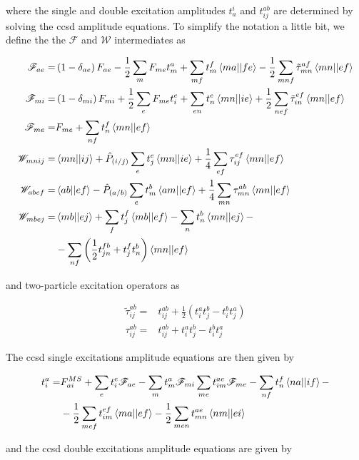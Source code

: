 where the single and double excitation amplitudes \(t_a^i\) and \(t_{ij}^{ab}\) are determined by solving the \acrshort{ccsd} amplitude equations. To simplify the notation a little bit, we define the the \(\mathscr{F}\) and \(\mathscr{W}\) intermediates as

\begin{align}
\mathscr{F}_{ae}=&\left(1-\delta_{ae}\right)F_{ae}-\frac{1}{2}\sum_mF_{me}t_m^a+\sum_{mf}t_m^f\braket{ma||fe}-\frac{1}{2}\sum_{mnf}\tilde{\tau}_{mn}^{af}\braket{mn||ef} \\
\mathscr{F}_{mi}=&\left(1-\delta_{mi}\right)F_{mi}+\frac{1}{2}\sum_eF_{me}t_i^e+\sum_{en}t_n^e\braket{mn||ie}+\frac{1}{2}\sum_{nef}\tilde{\tau}_{in}^{ef}\braket{mn||ef} \\
\mathscr{F}_{me}=&F_{me}+\sum_{nf}t_n^f\braket{mn||ef} \\
\mathscr{W}_{mnij}=&\braket{mn||ij}+\hat{P}_{(i/j)}\sum_et_j^e\braket{mn||ie}+\frac{1}{4}\sum_{ef}\tau_{ij}^{ef}\braket{mn||ef} \\
\mathscr{W}_{abef}=&\braket{ab||ef}-\hat{P}_{(a/b)}\sum_et_m^b\braket{am||ef}+\frac{1}{4}\sum_{mn}\tau_{mn}^{ab}\braket{mn||ef} \\
\mathscr{W}_{mbej}=&\braket{mb||ej}+\sum_ft_j^f\braket{mb||ef}-\sum_nt_n^b\braket{mn||ej}- \\
&-\sum_{nf}\left(\frac{1}{2}t_{jn}^{fb}+t_j^ft_n^b\right)\braket{mn||ef}
\end{align}

and two-particle excitation operators as

\begin{align}
\tilde{\tau}_{ij}^{ab}=&t_{ij}^{ab}+\frac{1}{2}\left(t_i^at_j^b-t_i^bt_j^a\right) \\
\tau_{ij}^{ab}=&t_{ij}^{ab}+t_i^at_j^b-t_i^bt_j^a
\end{align}

The \acrshort{ccsd} single excitations amplitude equations are then given by

\begin{align}
t_i^a=&F_{ai}^{MS}+\sum_et_i^e\mathscr{F}_{ae}-\sum_mt_m^a\mathscr{F}_{mi}\sum_{me}t_{im}^{ae}\mathscr{F}_{me}-\sum_{nf}t_n^f\braket{na||if}-\nonumber \\
&-\frac{1}{2}\sum_{mef}t_{im}^{ef}\braket{ma||ef}-\frac{1}{2}\sum_{men}t_{mn}^{ae}\braket{nm||ei}
\end{align}

and the \acrshort{ccsd} double excitations amplitude equations are given by

